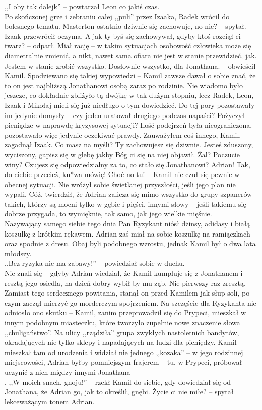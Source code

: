 \documentclass[../MAIN.tex]{subfiles}
\begin{document}
,,I oby tak dalej\3k'' -- powtarzał Leon co jakiś czas.\\
Po skończonej grze i zebraniu całej ,,puli'' przez Izaaka, Radek wrócił do bolesnego tematu.
\sx Masterton ostatnio dziwnie się zachowuje, no nie? -- spytał.
\qd
Izaak przewrócił oczyma.
\sx A jak ty byś się zachowywał, gdyby ktoś rozciął ci twarz? -- odparł. 
\qd
Miał rację -- w takim sytuacjach osobowość człowieka może się diametralnie zmienić, a nikt, nawet sama ofiara nie jest w stanie przewidzieć, jak.
\sx Jestem w stanie zrobić wszystko. Dosłownie wszystko, dla Jonathana. -- obwieścił Kamil. 
\qd
Spodziewano się takiej wypowiedzi -- Kamil zawsze dawał o sobie znać, że to on jest najbliższą Jonathanowi osobą zaraz po rodzinie. Nie wiadomo było jeszcze, co dokładnie zbliżyło tą dwójkę w tak dużym stopniu, lecz Radek, Leon, Izaak i Mikołaj mieli się już niedługo o tym dowiedzieć. Do tej pory pozostawały im jedynie domysły -- czy jeden uratował drugiego podczas napaści? Pożyczył pieniądze w naprawdę kryzysowej sytuacji? Ilość podejrzeń była nieograniczona, pozostawało więc jedynie oczekiwać prawdy.
\sx Zauważyłem coś innego, Kamil. -- zagadnął Izaak.
\xx Co masz na myśli?
\xx Ty zachowujesz się dziwnie. Jesteś zduszony, wyciszony, gapisz się w glebę jakby Bóg ci się na niej objawił. Żal? Poczucie winy? Czujesz się odpowiedzialny za to, co stało się Jonathanowi?
\xx Adrian! Tak, do ciebie przecież, ku*wa mówię! Choć no tu! -- Kamil nie czuł się pewnie w obecnej sytuacji. 
\qd
Nie wróżył sobie świetlanej przyszłości, jeśli jego plan nie wypali. Cóż, twierdził, że Adrian zalicza się mimo wszystko do grupy szpanerów -- takich, którzy są mocni tylko w gębie i pięści, innymi słowy -- jeśli takiemu się dobrze przygada, to wymięknie, tak samo, jak jego wielkie mięśnie.\\
Nazywający samego siebie tego dnia Pan Ryzykant niósł dżinsy, adidasy i białą koszulkę z krótkim rękawem. Adrian zaś miał na sobie koszulkę na ramiączkach oraz spodnie z dresu. Obaj byli podobnego wzrostu, jednak Kamil był o dwa lata młodszy.\\
,,Bez ryzyka nie ma zabawy!'' -- powiedział sobie w duchu.\\
Nie znali się -- gdyby Adrian wiedział, że Kamil kumpluje się z Jonathanem i resztą jego osiedla, na dzień dobry wybił by mu ząb. Nie pierwszy raz zresztą.\\
Zamiast tego serdecznego powitania, stanął on przed Kamilem jak słup soli, po czym zaczął mierzyć go morderczym spojrzeniem. Na szczęście dla Ryzykanta nie odniosło ono skutku -- Kamil, zanim przeprowadził się do Prypeci, mieszkał w innym podobnym miasteczku, które tworzyło zupełnie nowe znaczenie słowa ,,chuligaństwo''. Na ulicy ,,rządziła'' grupa zwykłych nastoletnich bandytów, okradających nie tylko sklepy i napadających na ludzi dla pieniędzy. Kamil mieszkał tam od urodzenia i widział nie jednego ,,kozaka'' -- w jego rodzinnej miejscowości, Adrian byłby pomniejszym frajerem -- tu, w Prypeci, próbował uczynić z nich między innymi Jonathana\\.
,,W moich snach, gnoju!'' -- rzekł Kamil do siebie, gdy dowiedział się od Jonathana, że Adrian go, jak to określił, gnębi.
\sx Życie ci nie miłe? -- spytał lekceważącym tonem Adrian.
\qd
\end{document}
